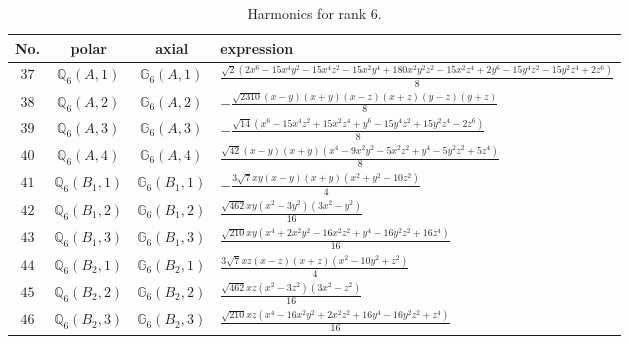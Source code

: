 \documentclass[fleqn,8pt,landscape]{jsarticle}
\begin{document}
\begin{table}[ht!]
\begin{center}
\caption{Harmonics for rank 6.}
\renewcommand{\arraystretch}{1.3}
\begin{tabular}{cccl} \hline \hline
No. & polar & axial & expression \\ \hline
$ 37 $ & $ \mathbb{Q}_{6}(A,1) $ & $ \mathbb{G}_{6}(A,1) $ & $ \frac{\sqrt{2} \left(2 x^{6} - 15 x^{4} y^{2} - 15 x^{4} z^{2} - 15 x^{2} y^{4} + 180 x^{2} y^{2} z^{2} - 15 x^{2} z^{4} + 2 y^{6} - 15 y^{4} z^{2} - 15 y^{2} z^{4} + 2 z^{6}\right)}{8} $ \\
$ 38 $ & $ \mathbb{Q}_{6}(A,2) $ & $ \mathbb{G}_{6}(A,2) $ & $ - \frac{\sqrt{2310} \left(x - y\right) \left(x + y\right) \left(x - z\right) \left(x + z\right) \left(y - z\right) \left(y + z\right)}{8} $ \\
$ 39 $ & $ \mathbb{Q}_{6}(A,3) $ & $ \mathbb{G}_{6}(A,3) $ & $ - \frac{\sqrt{14} \left(x^{6} - 15 x^{4} z^{2} + 15 x^{2} z^{4} + y^{6} - 15 y^{4} z^{2} + 15 y^{2} z^{4} - 2 z^{6}\right)}{8} $ \\
$ 40 $ & $ \mathbb{Q}_{6}(A,4) $ & $ \mathbb{G}_{6}(A,4) $ & $ \frac{\sqrt{42} \left(x - y\right) \left(x + y\right) \left(x^{4} - 9 x^{2} y^{2} - 5 x^{2} z^{2} + y^{4} - 5 y^{2} z^{2} + 5 z^{4}\right)}{8} $ \\
$ 41 $ & $ \mathbb{Q}_{6}(B_{1},1) $ & $ \mathbb{G}_{6}(B_{1},1) $ & $ - \frac{3 \sqrt{7} x y \left(x - y\right) \left(x + y\right) \left(x^{2} + y^{2} - 10 z^{2}\right)}{4} $ \\
$ 42 $ & $ \mathbb{Q}_{6}(B_{1},2) $ & $ \mathbb{G}_{6}(B_{1},2) $ & $ \frac{\sqrt{462} x y \left(x^{2} - 3 y^{2}\right) \left(3 x^{2} - y^{2}\right)}{16} $ \\
$ 43 $ & $ \mathbb{Q}_{6}(B_{1},3) $ & $ \mathbb{G}_{6}(B_{1},3) $ & $ \frac{\sqrt{210} x y \left(x^{4} + 2 x^{2} y^{2} - 16 x^{2} z^{2} + y^{4} - 16 y^{2} z^{2} + 16 z^{4}\right)}{16} $ \\
$ 44 $ & $ \mathbb{Q}_{6}(B_{2},1) $ & $ \mathbb{G}_{6}(B_{2},1) $ & $ \frac{3 \sqrt{7} x z \left(x - z\right) \left(x + z\right) \left(x^{2} - 10 y^{2} + z^{2}\right)}{4} $ \\
$ 45 $ & $ \mathbb{Q}_{6}(B_{2},2) $ & $ \mathbb{G}_{6}(B_{2},2) $ & $ \frac{\sqrt{462} x z \left(x^{2} - 3 z^{2}\right) \left(3 x^{2} - z^{2}\right)}{16} $ \\
$ 46 $ & $ \mathbb{Q}_{6}(B_{2},3) $ & $ \mathbb{G}_{6}(B_{2},3) $ & $ \frac{\sqrt{210} x z \left(x^{4} - 16 x^{2} y^{2} + 2 x^{2} z^{2} + 16 y^{4} - 16 y^{2} z^{2} + z^{4}\right)}{16} $ \\

\end{tabular}
\end{center}
\end{table}
\end{document}
